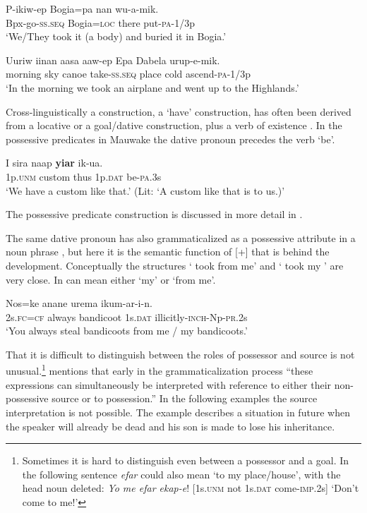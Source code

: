 \ea%
\label{ex:3:x1802}
\gll P-ikiw-ep Bogia=pa nan wu-a-mik. \\
Bpx-go-\textsc{ss}.\textsc{seq} Bogia=\textsc{loc} there put-\textsc{pa}-1/3p\\
\glt`We/They took it (a body) and buried it in Bogia.'
\z

\ea%
\label{ex:3:x1800}
\gll Uuriw iinan aasa aaw-ep Epa Dabela urup-e-mik. \\
morning sky canoe take-\textsc{ss}.\textsc{seq} place cold ascend-\textsc{pa}-1/3p\\
\glt`In the morning we took an airplane and went up to the Highlands.'
\z

Cross-linguistically a  construction, a `have' construction, has often been derived from a locative or a goal/dative construction, plus a verb of existence \citep[50--61]{Heine1997}. In the possessive predicates in Mauwake the dative pronoun precedes the verb \textstyleStyleVernacularWordsItalic{-} `be'. 

\ea%
\label{ex:3:x1788}
\gll I sira naap \textbf{yiar} ik-ua. \\
1p.\textsc{unm} custom thus 1p.\textsc{dat} be-\textsc{pa}.3s\\
\glt`We have a custom like that.' (Lit: `A custom like that is to us.)'
\z

The possessive predicate construction is discussed in more detail in . 

The same dative pronoun has also grammaticalized as a possessive attribute in a noun phrase , but here it is the semantic function of [+]  that is behind the development. Conceptually the structures ` took  from me' and ` took my ' are very close. In   can mean either `my' or `from me'. 

\ea%
\label{ex:3:x581}
\gll Nos=ke anane urema  ikum-ar-i-n. \\
2s.\textsc{fc}=\textsc{cf} always bandicoot 1s.\textsc{dat} illicitly-\textsc{inch}-Np-\textsc{pr}.2s\\
\glt`You always steal bandicoots from me / my bandicoots.'
\z

That it is difficult to distinguish between the roles of possessor and source is not unusual.\footnote{Sometimes it is hard to distinguish even between a possessor and a goal. In the following sentence \textit{efar} could also mean `to my place/house', with the head noun deleted: \textit{Yo me efar ekap-e}! [1s.\textsc{unm} not 1s.\textsc{dat} come-\textsc{imp}.2s] `Don't come to me!' } \citet[133]{Heine1997} mentions that early in the grammaticalization process ``these expressions can simultaneously be interpreted with reference to either their non-possessive source or to possession.'' In the following examples the source interpretation is not possible. The example  describes a situation in future when the speaker will already be dead and his son is made to lose his inheritance.

